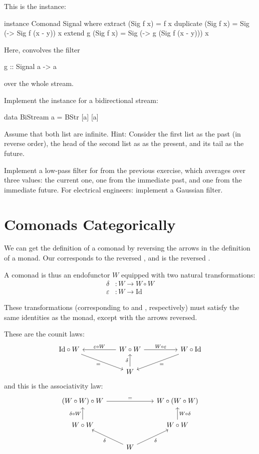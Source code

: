 \documentclass[DaoFP]{subfiles}
\begin{document}
This is the  instance:
\begin{haskell}
instance Comonad Signal where
  extract (Sig f x) = f x
  duplicate (Sig f x) = Sig (\y -> Sig f (x - y)) x
  extend g (Sig f x) = Sig (\y -> g (Sig f (x - y))) x
\end{haskell}
Here,  convolves the filter 
\begin{haskell}
g :: Signal a -> a
\end{haskell}
over the whole stream. 

\begin{exercise}
Implement the  instance for a bidirectional stream:
\begin{haskell}
data BiStream a = BStr [a] [a]
\end{haskell}
Assume that both list are infinite. Hint: Consider the first list as the past (in reverse order), the head of the second list as as the present, and its tail as the future.
\end{exercise}

\begin{exercise}
Implement a low-pass filter for  from the previous exercise, which averages over three values: the current one, one from the immediate past, and one from the immediate future. For electrical engineers: implement a Gaussian filter. 
\end{exercise}

\section{Comonads Categorically}

We can get the definition of a comonad by reversing the arrows in the definition of a monad. Our  corresponds to the reversed , and  is the reversed . 


A comonad is thus an endofunctor $W$ equipped with two natural transformations:
\begin{align*}
\delta &\colon W \to W \circ W \\
\varepsilon &\colon W \to \text{Id} 
\end{align*}

These transformations (corresponding to  and , respectively) must satisfy the same identities as the monad, except with the arrows reversed. 

These are the counit laws:
\[
 \begin{tikzcd}
\text{Id} \circ W
 \arrow[rrd, "="']
& & W \circ W
 \arrow[ll, "\varepsilon \circ W"']
 \arrow[rr, "W \circ \varepsilon"]
&& W \circ \text{Id}
 \arrow[lld, "="]
 \\
 && W
  \arrow[u, "\delta"]
 \end{tikzcd}
\]
and this is the associativity law:
\[
 \begin{tikzcd}
 (W \circ W) \circ W 
 \arrow[rr, "="]
 &&
 W \circ (W \circ W)
 \\
 W \circ W 
 \arrow[u, "\delta \circ W"]
& & W \circ W
 \arrow[u, "W \circ \delta"']
 \\
&  W
 \arrow[ul, "\delta"]
 \arrow[ur, "\delta"']
 \end{tikzcd}
\]
\end{document}
